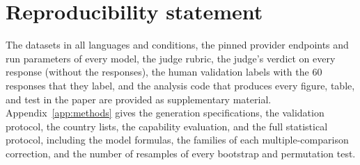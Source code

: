 \section*{Reproducibility statement}

The datasets in all languages and conditions, the pinned provider endpoints and run parameters of every model, the judge rubric, the judge's verdict on every response (without the responses), the human validation labels with the 60 responses that they label, and the analysis code that produces every figure, table, and test in the paper are provided as supplementary material. Appendix~\ref{app:methods} gives the generation specifications, the validation protocol, the country lists, the capability evaluation, and the full statistical protocol, including the model formulas, the families of each multiple-comparison correction, and the number of resamples of every bootstrap and permutation test.
